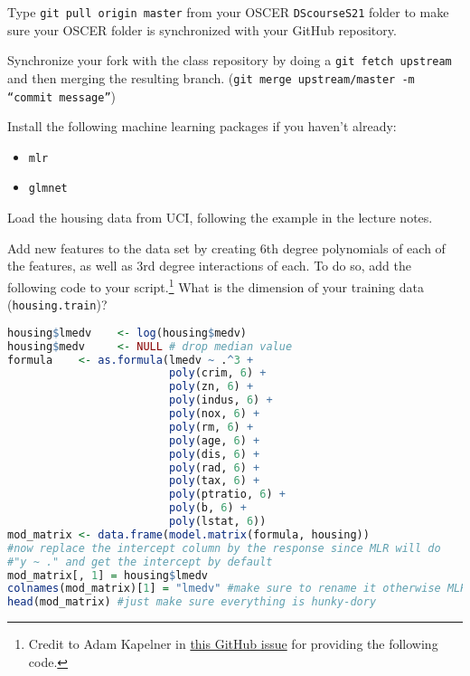 \documentclass[12pt,english]{exam}
\begin{document}
\begin{questions}
\question Type \texttt{git pull origin master} from your OSCER \texttt{DScourseS21} folder to make sure your OSCER folder is synchronized with your GitHub repository. 

\question Synchronize your fork with the class repository by doing a \texttt{git fetch upstream} and then merging the resulting branch. (\texttt{git merge upstream/master -m ``commit message''})

\question Install the following machine learning packages if you haven't already:
\begin{itemize}
    \item \texttt{mlr}
    \item \texttt{glmnet}
\end{itemize}

\question Load the housing data from UCI, following the example in the lecture notes.

\question Add new features to the data set by creating 6th degree polynomials of each of the features, as well as 3rd degree interactions of each. To do so, add the following code to your script.\footnote{Credit to Adam Kapelner in \href{https://github.com/mlr-org/mlr/issues/564}{this GitHub issue} for providing the following code.} What is the dimension of your training data (\texttt{housing.train})?
\begin{lstlisting}[language=R]
housing$lmedv    <- log(housing$medv)
housing$medv     <- NULL # drop median value
formula    <- as.formula(lmedv ~ .^3 +
                         poly(crim, 6) + 
                         poly(zn, 6) + 
                         poly(indus, 6) + 
                         poly(nox, 6) + 
                         poly(rm, 6) +
                         poly(age, 6) + 
                         poly(dis, 6) +
                         poly(rad, 6) + 
                         poly(tax, 6) + 
                         poly(ptratio, 6) + 
                         poly(b, 6) + 
                         poly(lstat, 6))
mod_matrix <- data.frame(model.matrix(formula, housing))
#now replace the intercept column by the response since MLR will do 
#"y ~ ." and get the intercept by default
mod_matrix[, 1] = housing$lmedv
colnames(mod_matrix)[1] = "lmedv" #make sure to rename it otherwise MLR won't find it
head(mod_matrix) #just make sure everything is hunky-dory


\end{lstlisting}
\end{questions}
\end{document}
